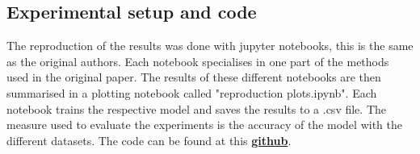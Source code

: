 \subsection{Experimental setup and code}
The reproduction of the results was done with jupyter notebooks, this is the same as the original authors. Each notebook specialises in one part of the methods used in the original paper. The results of these different notebooks are then summarised in a plotting notebook called "reproduction plots.ipynb". Each notebook trains the respective model and saves the results to a .csv file. The measure used to evaluate the experiments is the accuracy of the model with the different datasets. The code can be found at this \href{https://anonymous.4open.science/r/Strategic_classification_made_practical_reproduce_91BD/README.md}{\textbf{github}}.


